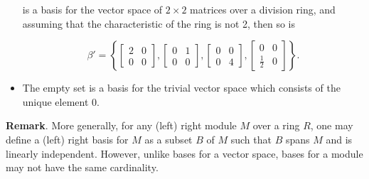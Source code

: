 \documentclass[12pt]{article}
\begin{document}
\begin{itemize}
is a basis for the vector space of $2 \times 2$ matrices over a division ring, and assuming that the characteristic of the ring is not 2, then so is

$$ \beta' =   
\left\{ \begin{bmatrix}2 & 0 \\ 0 & 0 \end{bmatrix} ,
\begin{bmatrix}0 & 1 \\ 0 & 0 \end{bmatrix} ,
\begin{bmatrix}0 & 0 \\ 0 & 4 \end{bmatrix} ,
\begin{bmatrix}0 & 0 \\ \frac{1}{2} & 0 \end{bmatrix} \right\}. $$

\item The empty set is a basis for the trivial vector space which consists of the unique element $0$. 

\end{itemize}

\textbf{Remark}.  More generally, for any (left) right module $M$ over a ring $R$, one may define a (left) right basis for $M$ as a subset $B$ of $M$ such that $B$ spans $M$ and is linearly independent.  However, unlike bases for a vector space, bases for a module may not have the same cardinality.
\end{document}
